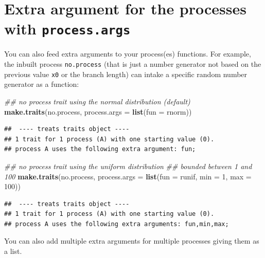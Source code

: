 \documentclass[
]{book}
\newenvironment{Shaded}{\begin{snugshade}}{\end{snugshade}}
\newcommand{\CommentTok}[1]{\textcolor[rgb]{0.56,0.35,0.01}{\textit{#1}}}
\newcommand{\DataTypeTok}[1]{\textcolor[rgb]{0.13,0.29,0.53}{#1}}
\newcommand{\DecValTok}[1]{\textcolor[rgb]{0.00,0.00,0.81}{#1}}
\newcommand{\KeywordTok}[1]{\textcolor[rgb]{0.13,0.29,0.53}{\textbf{#1}}}
\newcommand{\NormalTok}[1]{#1}
\begin{document}
\hypertarget{extra-argument-for-the-processes-with-process.args}{%
\section{\texorpdfstring{Extra argument for the processes with \texttt{process.args}}{Extra argument for the processes with process.args}}\label{extra-argument-for-the-processes-with-process.args}}

You can also feed extra arguments to your process(es) functions. For example, the inbuilt process \texttt{no.process} (that is just a number generator not based on the previous value \texttt{x0} or the branch length) can intake a specific random number generator as a function:

\begin{Shaded}
\begin{Highlighting}[]
\CommentTok{\#\# no process trait using the normal distribution (default)}
\KeywordTok{make.traits}\NormalTok{(no.process, }\DataTypeTok{process.args =} \KeywordTok{list}\NormalTok{(}\DataTypeTok{fun =}\NormalTok{ rnorm))}
\end{Highlighting}
\end{Shaded}

\begin{verbatim}
##  ---- treats traits object ---- 
## 1 trait for 1 process (A) with one starting value (0).
## process A uses the following extra argument: fun;
\end{verbatim}

\begin{Shaded}
\begin{Highlighting}[]
\CommentTok{\#\# no process trait using the uniform distribution}
\CommentTok{\#\# bounded between 1 and 100}
\KeywordTok{make.traits}\NormalTok{(no.process, }\DataTypeTok{process.args =} \KeywordTok{list}\NormalTok{(}\DataTypeTok{fun =}\NormalTok{ runif, }\DataTypeTok{min =} \DecValTok{1}\NormalTok{, }\DataTypeTok{max =} \DecValTok{100}\NormalTok{))}
\end{Highlighting}
\end{Shaded}

\begin{verbatim}
##  ---- treats traits object ---- 
## 1 trait for 1 process (A) with one starting value (0).
## process A uses the following extra arguments: fun,min,max;
\end{verbatim}

You can also add multiple extra arguments for multiple processes giving them as a list.
\end{document}
